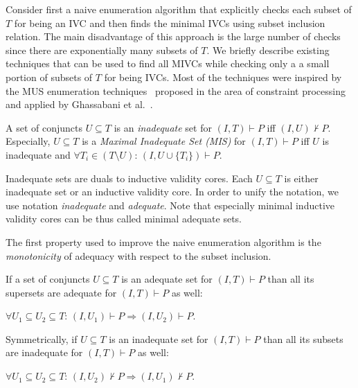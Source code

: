 \newcommand{\fUnex}{f_{\mathit{Unexplored}}}
Consider first
a naive enumeration algorithm that   explicitly checks each subset of $T$ for being an IVC  and then finds the minimal IVCs  using subset inclusion relation. The main disadvantage of this approach is the large number of checks since there are exponentially many subsets of $T$.
We briefly describe existing techniques that can be used to find all MIVCs while checking only a a small portion of subsets of $T$  for being IVCs.  Most of the techniques were inspired by the MUS enumeration techniques~\cite{Liffiton2016,bacchus2015using,belov2012muser2,nadel2014accelerated,DBLP:conf/sefm/BendikBBC16,DBLP:conf/fsttcs/BendikBCB16}   proposed in the area of constraint processing and applied by Ghassabani et al.~\cite{Ghass17AllIVCs,Ghass16}.


\begin{definition}[Inadequacy] A set of conjuncts  $U \subseteq T$  is an \emph{inadequate} set for $(I, T) \vdash P$ iff $(I, U) \nvdash P$. Especially, $U \subseteq T$ is a \emph{Maximal Inadequate Set (MIS)} for $(I, T) \vdash P$ iff $U$ is inadequate and $\forall T_i \in (T \setminus U): \, (I, U \cup \{ T_i\}) \vdash P$.
\end{definition}

Inadequate sets are duals to inductive validity cores. Each $U \subseteq T$ is either inadequate set or an inductive validity core. In order to unify the notation, we   use notation \emph{inadequate} and \emph{adequate}. Note that especially minimal inductive validity cores can be thus called  minimal adequate sets.



The first property used to improve the naive enumeration algorithm is the \emph{monotonicity} of  adequacy   with respect to the subset inclusion.

\begin{lemma}[Monotonicity]
\label{lemma:monotonicity}
If a set of conjuncts  $U \subseteq T$  is an adequate set for $(I, T) \vdash P$   than all its supersets are adequate for  $(I, T) \vdash P$ as well:\\ 

\vspace{-10pt}
\centerline{$\forall U_1 \subseteq U_2 \subseteq T: \, (I, U_1) \vdash P \Rightarrow (I, U_2) \vdash P$.}
\vspace{2pt}
\noindent
Symmetrically, if   $U \subseteq T$  is an inadequate set for $(I, T) \vdash P$   than all its subsets are inadequate for  $(I, T) \vdash P$ as well:\\ 

\vspace{-10pt}
\centerline{$\forall U_1 \subseteq U_2 \subseteq T: \, (I, U_2) \nvdash P \Rightarrow (I, U_1) \nvdash P$.}
\end{lemma}

